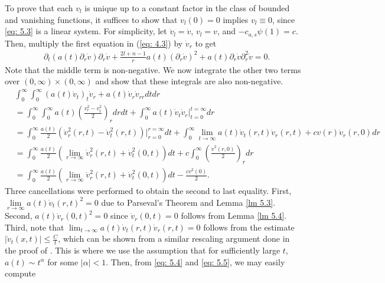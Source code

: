 \documentclass{article}
\begin{document}
To prove that each $v_l$ is unique up to a constant factor in the class of bounded and vanishing functions, it suffices to show that $v_l(0)=0$ implies  $v_l \equiv 0$, since \eqref{eq: 5.3} is a linear system. For simplicity, let $\dot{v}_l = \dot{v}$, $v_l = v$, and $-c_{a,s}\psi (1)= c$. Then, multiply the first equation in (\ref{eq: 4.3})  by $\dot{v}_r$ to get
\begin{align*}
    &\partial_t(a(t) \partial_r \dot{v})\partial_r \dot{v} + \frac{2l+n-1}{r}a(t)(\partial_r \dot{v})^2+a(t) \partial_r \dot{v}\partial_r^2 \dot{v}=0.
        \tag{5.4} \label{eq: 5.4}
\end{align*}
Note that the middle term is non-negative. We now integrate the other two terms over $(0, \infty) \times (0, \infty)$ and show that these integrals are also non-negative.
\begin{align*}
 &\int_{0}^{\infty}\int_{0}^{\infty}(a(t) \dot{v}_t)_t  \dot{v}_r + a(t) \dot{v}_r  \dot{v}_{rr} dtdr\\
&= \int_{0}^{\infty}\int_{0}^{\infty} a(t) \left(\frac{v_r^2-v_t^2}{2} \right)_r drdt + \int_{0}^\infty a(t)\dot{v}_t\dot{v}_r\vert_{t=0}^{t=\infty} dr \\
&= \int_{0}^{\infty} \frac{a(t)}{2} \left(\dot{v}_r^2(r,t)- \dot{v}_t^2(r,t)\right)\vert_{r=0}^{r=\infty}dt + \int_{0}^\infty \lim_{t \to \infty} a(t)\dot{v}_t(r,t) \dot{v}_r(r,t) + cv(r)\dot{v}_r(r,0) dr \\
&= \int_{0}^{\infty} \frac{a(t)}{2} \left( \lim_{r \to \infty} \dot{v}_r^2(r,t) + \dot{v}_t^2(0,t)\right)dt + c\int_{0}^\infty \left(\frac{\dot{v}^2(r,0)}{2}\right)_r dr \\
&= \int_{0}^{\infty} \frac{a(t)}{2} \left( \lim_{r \to \infty} \dot{v}_r^2(r,t) + \dot{v}_t^2(0,t)\right)dt - \frac{cv^2(0)}{2}.
 \tag{5.5} \label{eq: 5.5}
\end{align*}
Three cancellations were performed to obtain the second to last equality. First, $\lim\limits_{r \to \infty}a(t)\dot{v}_t(r, t)^2=0$ due to Parseval's Theorem and Lemma \ref{lm 5.3}. Second, $a(t)\dot{v}_r(0, t)^2=0$ since $\dot{v}_r(0,t)=0$ follows from Lemma \ref{lm 5.4}. Third, note that $\lim_{t \to \infty} a(t)\dot{v}_t(r,t) \dot{v}_r(r,t)=0$ follows from the estimate $|\dot{v}_t(x,t)| \le \frac{C}{t}$, which can be shown from a  similar rescaling argument done in the proof of \cite[Prop 4.6]{cabre}. This is where we use the assumption that for sufficiently large $t$, $a(t) \sim t^\alpha$ for some $|\alpha|<1$. Then, from \eqref{eq: 5.4} and \eqref{eq: 5.5}, we may easily compute
\end{document}
